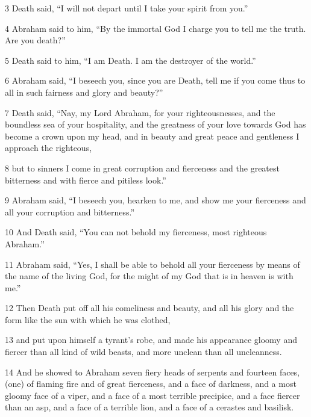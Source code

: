 \par 3 Death said, “I will not depart until I take your spirit from you.” 

\par 4 Abraham said to him, “By the immortal God I charge you to tell me the truth. Are you death?” 

\par 5 Death said to him, “I am Death. I am the destroyer of the world.” 

\par 6 Abraham said, “I beseech you, since you are Death, tell me if you come thus to all in such fairness and glory and beauty?” 

\par 7 Death said, “Nay, my Lord Abraham, for your righteousnesses, and the boundless sea of your hospitality, and the greatness of your love towards God has become a crown upon my head, and in beauty and great peace and gentleness I approach the righteous, 

\par 8 but to sinners I come in great corruption and fierceness and the greatest bitterness and with fierce and pitiless look.” 

\par 9 Abraham said, “I beseech you, hearken to me, and show me your fierceness and all your corruption and bitterness.” 

\par 10 And Death said, “You can not behold my fierceness, most righteous Abraham.” 

\par 11 Abraham said, “Yes, I shall be able to behold all your fierceness by means of the name of the living God, for the might of my God that is in heaven is with me.” 

\par 12 Then Death put off all his comeliness and beauty, and all his glory and the form like the sun with which he was clothed, 

\par 13 and put upon himself a tyrant's robe, and made his appearance gloomy and fiercer than all kind of wild beasts, and more unclean than all uncleanness. 

\par 14 And he showed to Abraham seven fiery heads of serpents and fourteen faces, (one) of flaming fire and of great fierceness, and a face of darkness, and a most gloomy face of a viper, and a face of a most terrible precipice, and a face fiercer than an asp, and a face of a terrible lion, and a face of a cerastes and basilisk. 

